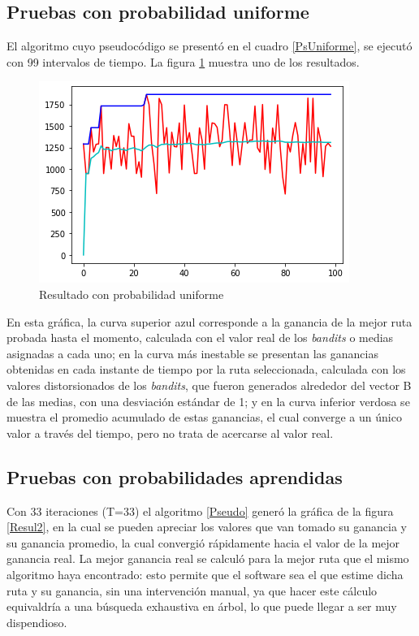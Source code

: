 \subsection{Pruebas con probabilidad uniforme}

El algoritmo cuyo pseudocódigo se presentó en el cuadro \ref{PsUniforme}, se ejecutó con 99 intervalos de tiempo. La figura \ref{fig:uniforme} muestra uno de los resultados. 

\begin{figure}[H]
	\centering
	\includegraphics[scale=1]{Uniforme}
	\caption{Resultado con probabilidad uniforme}
	\label{fig:uniforme}
\end{figure}

En esta gráfica, la curva superior azul corresponde a la ganancia de la mejor ruta probada hasta el momento, calculada con el valor real de los \textit{bandits} o medias asignadas a cada uno; en la curva más inestable se presentan las ganancias obtenidas en cada instante de tiempo por la ruta seleccionada, calculada con los valores distorsionados de los \textit{bandits}, que fueron generados alrededor del vector B de las medias, con una desviación estándar de 1; y en la curva inferior verdosa se muestra el promedio acumulado de estas ganancias, el cual converge a un único valor a través del tiempo, pero no trata de acercarse al valor real.

\subsection{Pruebas con probabilidades aprendidas}

Con 33 iteraciones (T=33) el algoritmo \ref{Pseudo} generó la gráfica de la figura \ref{Resul2}, en la cual se pueden apreciar los valores que van tomado su ganancia y su ganancia promedio, la cual convergió rápidamente hacia el valor de la mejor ganancia real. La mejor ganancia real se calculó para la mejor ruta que el mismo algoritmo haya encontrado: esto permite que el software sea el que estime dicha ruta y su ganancia, sin una intervención manual, ya que hacer este cálculo equivaldría a una búsqueda exhaustiva en árbol, lo que puede llegar a ser muy dispendioso.

